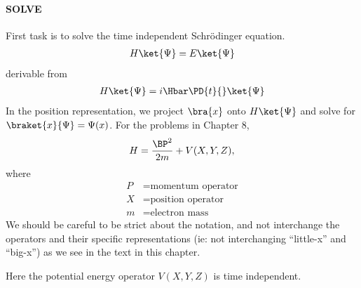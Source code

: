 {\paragraph{SOLVE}
First task is to solve the time independent Schr\"{o}dinger equation.
%
\begin{equation}\label{eqn:PHY356Lecture9:1}
\begin{aligned}
H \ket{\Psi} = E \ket{\Psi}
\end{aligned}
\end{equation}
%
derivable from
\begin{equation}\label{eqn:PHY356Lecture9:2}
\begin{aligned}
H \ket{\Psi} = i \Hbar \PD{t}{} \ket{\Psi}
\end{aligned}
\end{equation}
%
In the position representation, we project \(\bra{x}\) onto \(H \ket{\Psi}\) and solve for \(\braket{x}{\Psi} = \Psi(x)\).  For the problems in Chapter 8,
%
\begin{equation}\label{eqn:PHY356Lecture9:3}
\begin{aligned}
H = \frac{\BP^2}{2m} + V(X,Y,Z),
\end{aligned}
\end{equation}
%
where
\begin{equation}\label{eqn:lecture9boundStates:60}
\begin{aligned}
P &= \text{momentum operator} \\
X &= \text{position operator} \\
m &= \text{electron mass}
\end{aligned}
\end{equation}
%
We should be careful to be strict about the notation, and not interchange the operators and their specific representations (ie: not interchanging ``little-x'' and ``big-x'') as we see in the text in this chapter.

Here the potential energy operator \(V(X,Y,Z)\) is time independent.

}
